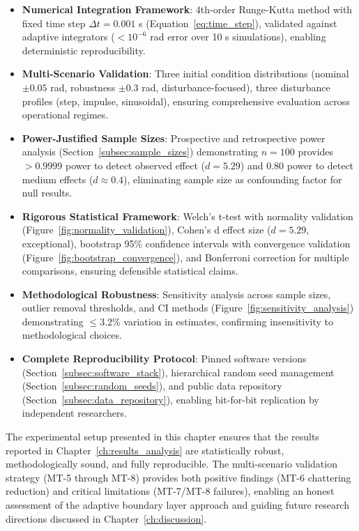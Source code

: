 \begin{itemize}
    \item \textbf{Numerical Integration Framework}: 4th-order Runge-Kutta method with fixed time step $\Delta t = 0.001$ s (Equation~\ref{eq:time_step}), validated against adaptive integrators ($< 10^{-6}$ rad error over 10 s simulations), enabling deterministic reproducibility.

    \item \textbf{Multi-Scenario Validation}: Three initial condition distributions (nominal $\pm 0.05$ rad, robustness $\pm 0.3$ rad, disturbance-focused), three disturbance profiles (step, impulse, sinusoidal), ensuring comprehensive evaluation across operational regimes.

    \item \textbf{Power-Justified Sample Sizes}: Prospective and retrospective power analysis (Section~\ref{subsec:sample_sizes}) demonstrating $n=100$ provides $> 0.9999$ power to detect observed effect ($d=5.29$) and $0.80$ power to detect medium effects ($d \approx 0.4$), eliminating sample size as confounding factor for null results.

    \item \textbf{Rigorous Statistical Framework}: Welch's t-test with normality validation (Figure~\ref{fig:normality_validation}), Cohen's d effect size ($d=5.29$, exceptional), bootstrap 95\% confidence intervals with convergence validation (Figure~\ref{fig:bootstrap_convergence}), and Bonferroni correction for multiple comparisons, ensuring defensible statistical claims.

    \item \textbf{Methodological Robustness}: Sensitivity analysis across sample sizes, outlier removal thresholds, and CI methods (Figure~\ref{fig:sensitivity_analysis}) demonstrating $\leq 3.2\%$ variation in estimates, confirming insensitivity to methodological choices.

    \item \textbf{Complete Reproducibility Protocol}: Pinned software versions (Section~\ref{subsec:software_stack}), hierarchical random seed management (Section~\ref{subsec:random_seeds}), and public data repository (Section~\ref{subsec:data_repository}), enabling bit-for-bit replication by independent researchers.
\end{itemize}

The experimental setup presented in this chapter ensures that the results reported in Chapter~\ref{ch:results_analysis} are statistically robust, methodologically sound, and fully reproducible. The multi-scenario validation strategy (MT-5 through MT-8) provides both positive findings (MT-6 chattering reduction) and critical limitations (MT-7/MT-8 failures), enabling an honest assessment of the adaptive boundary layer approach and guiding future research directions discussed in Chapter~\ref{ch:discussion}.
